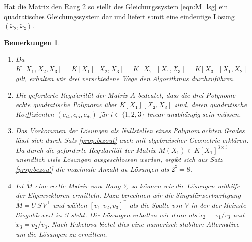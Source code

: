 \documentclass[a4paper,oneside, 11pt, openany%
]{article}
\theoremstyle{custom}
\theoremstyle{custom}
\newtheorem{remarks}[theorem]{Bemerkungen}
\begin{document}
	Hat die Matrix den Rang 2 so stellt des Gleichungssystem \eqref{eqn:M_lsg} ein quadratisches Gleichungssystem dar und liefert somit eine eindeutige Lösung $(\tilde{x}_{2},\tilde{x}_{3})$.
	\begin{remarks}
		~\begin{enumerate}
			\item Da $K[X_1,X_2,X_3] = K[X_1][X_2,X_3] = K[X_2][X_1,X_3] = K[X_3][X_1,X_2]$ gilt, erhalten wir drei verschiedene Wege den Algorithmus durchzuführen.
			\item Die geforderte Regularität der Matrix $A$ bedeutet, dass die drei Polynome echte quadratische Polynome über $K[X_1][X_2,X_3]$ sind, deren quadratische Koeffizienten $(c_{i4},c_{i5},c_{i6})$ für $i \in \{1,2,3\}$ linear unabhängig sein müssen.
			
			\item Das Vorkommen der Lösungen als Nullstellen eines Polynom achten Grades lässt sich durch Satz \ref{prop:bezout} auch mit algebraischer Geometrie erklären. Da durch die geforderte Regularität der Matrix $M(X_1) \in K[X_1]^{3 \times 3}$ unendlich viele Lösungen ausgeschlossen werden, ergibt sich aus Satz \ref{prop:bezout} die maximale Anzahl an Lösungen als $2^3=8$.
			\item Ist $\tilde{M}$ eine reelle Matrix vom Rang 2, so können wir die Lösungen mithilfe der Eigenvektoren ermitteln. Dazu berechnen wir die Singulärwertzerlegung $\tilde{M}=U \, S\, V^{\top}$ und wählen $\left[v_{1},v_{2},v_{3} \right]^{\top} $ als die Spalte von $V$ in der der kleinste Singulärwert in $S$ steht. Die Lösungen erhalten wir dann als $\tilde{x}_{2} = v_1/v_3$ und $\tilde{x}_{3} = v_2/v_3$.
			Nach Kukelova \cite{kukelova2016efficient} bietet dies eine numerisch stabilere Alternative um die Lösungen zu ermitteln.
		\end{enumerate}
	\end{remarks}
	\newpage
\end{document}
